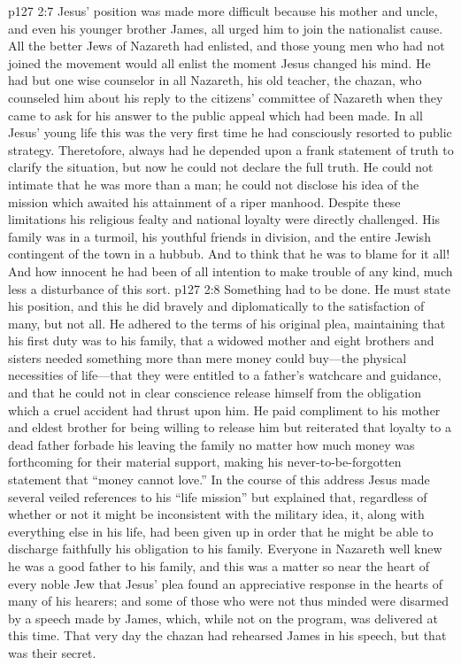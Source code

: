 \vs p127 2:7 Jesus’ position was made more difficult because his mother and uncle, and even his younger brother James, all urged him to join the nationalist cause. All the better Jews of Nazareth had enlisted, and those young men who had not joined the movement would all enlist the moment Jesus changed his mind. He had but one wise counselor in all Nazareth, his old teacher, the chazan, who counseled him about his reply to the citizens’ committee of Nazareth when they came to ask for his answer to the public appeal which had been made. In all Jesus’ young life this was the very first time he had consciously resorted to public strategy. Theretofore, always had he depended upon a frank statement of truth to clarify the situation, but now he could not declare the full truth. He could not intimate that he was more than a man; he could not disclose his idea of the mission which awaited his attainment of a riper manhood. Despite these limitations his religious fealty and national loyalty were directly challenged. His family was in a turmoil, his youthful friends in division, and the entire Jewish contingent of the town in a hubbub. And to think that he was to blame for it all! And how innocent he had been of all intention to make trouble of any kind, much less a disturbance of this sort.
\vs p127 2:8 Something had to be done. He must state his position, and this he did bravely and diplomatically to the satisfaction of many, but not all. He adhered to the terms of his original plea, maintaining that his first duty was to his family, that a widowed mother and eight brothers and sisters needed something more than mere money could buy---the physical necessities of life---that they were entitled to a father’s watchcare and guidance, and that he could not in clear conscience release himself from the obligation which a cruel accident had thrust upon him. He paid compliment to his mother and eldest brother for being willing to release him but reiterated that loyalty to a dead father forbade his leaving the family no matter how much money was forthcoming for their material support, making his never\hyp{}to\hyp{}be\hyp{}forgotten statement that \textcolor{ubdarkred}{“money cannot love.”} In the course of this address Jesus made several veiled references to his \textcolor{ubdarkred}{“life mission”} but explained that, regardless of whether or not it might be inconsistent with the military idea, it, along with everything else in his life, had been given up in order that he might be able to discharge faithfully his obligation to his family. Everyone in Nazareth well knew he was a good father to his family, and this was a matter so near the heart of every noble Jew that Jesus’ plea found an appreciative response in the hearts of many of his hearers; and some of those who were not thus minded were disarmed by a speech made by James, which, while not on the program, was delivered at this time. That very day the chazan had rehearsed James in his speech, but that was their secret.
